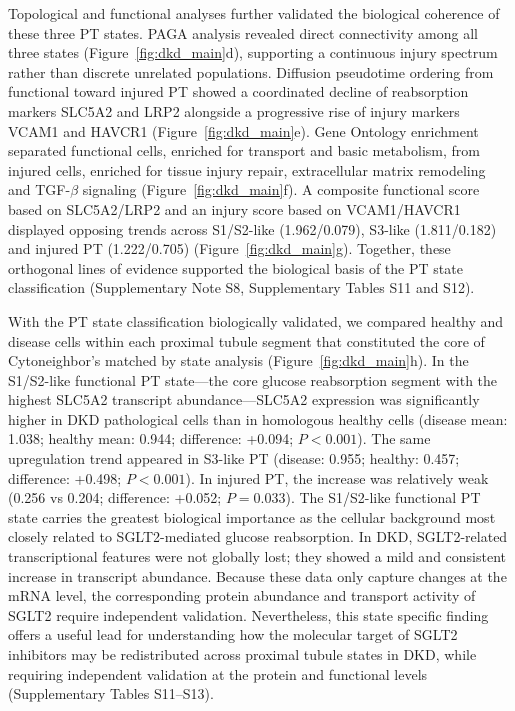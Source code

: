 \documentclass[11pt]{article}
\begin{document}
Topological and functional analyses further validated the biological coherence of these three PT states. PAGA analysis\cite{Wolf2019PAGA} revealed direct connectivity among all three states (Figure~\ref{fig:dkd_main}d), supporting a continuous injury spectrum rather than discrete unrelated populations. Diffusion pseudotime ordering from functional toward injured PT showed a coordinated decline of reabsorption markers SLC5A2 and LRP2 alongside a progressive rise of injury markers VCAM1 and HAVCR1 (Figure~\ref{fig:dkd_main}e). Gene Ontology enrichment separated functional cells, enriched for transport and basic metabolism, from injured cells, enriched for tissue injury repair, extracellular matrix remodeling and TGF-$\beta$ signaling (Figure~\ref{fig:dkd_main}f). A composite functional score based on SLC5A2/LRP2 and an injury score based on VCAM1/HAVCR1 displayed opposing trends across S1/S2-like (1.962/0.079), S3-like (1.811/0.182) and injured PT (1.222/0.705) (Figure~\ref{fig:dkd_main}g). Together, these orthogonal lines of evidence supported the biological basis of the PT state classification (Supplementary Note S8, Supplementary Tables S11 and S12).

With the PT state classification biologically validated, we compared healthy and disease cells within each proximal tubule segment that constituted the core of Cytoneighbor's matched by state analysis (Figure~\ref{fig:dkd_main}h). In the S1/S2-like functional PT state---the core glucose reabsorption segment with the highest SLC5A2 transcript abundance---SLC5A2 expression was significantly higher in DKD pathological cells than in homologous healthy cells (disease mean: 1.038; healthy mean: 0.944; difference: +0.094; $P < 0.001$). The same upregulation trend appeared in S3-like PT (disease: 0.955; healthy: 0.457; difference: +0.498; $P < 0.001$). In injured PT, the increase was relatively weak (0.256 vs 0.204; difference: +0.052; $P = 0.033$). The S1/S2-like functional PT state carries the greatest biological importance as the cellular background most closely related to SGLT2-mediated glucose reabsorption. In DKD, SGLT2-related transcriptional features were not globally lost; they showed a mild and consistent increase in transcript abundance. Because these data only capture changes at the mRNA level, the corresponding protein abundance and transport activity of SGLT2 require independent validation. Nevertheless, this state specific finding offers a useful lead for understanding how the molecular target of SGLT2 inhibitors may be redistributed across proximal tubule states in DKD, while requiring independent validation at the protein and functional levels (Supplementary Tables S11--S13).
\end{document}
